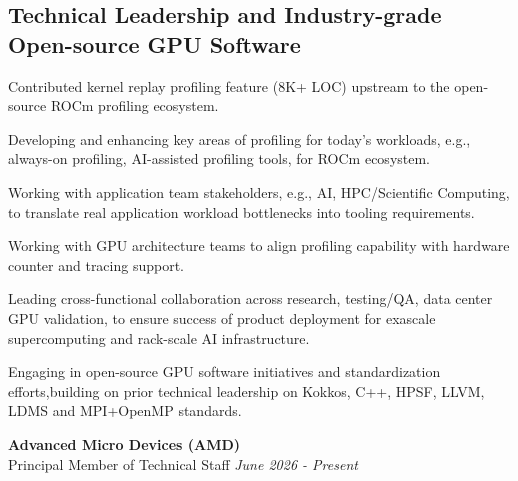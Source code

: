 \subsection*{Technical Leadership and Industry-grade Open-source GPU Software}

\myExpOne
{
\item Contributed kernel replay profiling feature (8K+ LOC) upstream to the open-source ROCm profiling ecosystem.
\item Developing and enhancing key areas of profiling for today’s workloads, e.g., always-on profiling, AI-assisted profiling tools, for ROCm ecosystem. 
\item Working with application team stakeholders, e.g., AI, HPC/Scientific Computing, to translate real application workload bottlenecks into tooling requirements.
\item Working with GPU architecture teams to align profiling capability with hardware counter and tracing support.
\item Leading cross-functional collaboration across research, testing/QA, data center GPU validation, to ensure success of product deployment for exascale supercomputing and rack-scale AI infrastructure. 
\item Engaging in open-source GPU software initiatives and standardization efforts,building on prior technical leadership on Kokkos, C++, HPSF, LLVM, LDMS and MPI+OpenMP standards.
}

\textbf{Advanced Micro Devices (AMD)}\\
{Principal Member of Technical Staff} \hfill \textit{June 2026 - Present}
\noindent
\begin{itemize}[itemsep=-0.1em]\onlyitems[include={1,2}]
\myExpOne
\end{itemize}

\newcommand{\myExpTwo}{
\item Software design and implementation for tools for distributed GPU programming with Kokkos, specifically (1) inter-process profiling and adaptivity via PMPI and (2) job-level monitoring and feedback via LDMS and DCGM.
\item Augmenting Kokkos Tools runtime auto-tuning via low-level metrics from, e.g., PAPI, CUPTI, instead of timings, reducing time to converge to optimal Kokkos tuning parameters by 32\%.
\item Developing energy-aware optimization for Kokkos via NVML, achieving 4x energy reduction.
\item Released a Spack package for Kokkos Tools, resulting in 16 new users of Kokkos Tools.
\item Developed AI-assisted HPC Tools through LLMs (coderosetta.com) and autotuning (TAU+APEX) for Kokkos applications run on NVIDIA GPUs, resulting in a poster presentation at GTC 2025.
\item Research and pathfinding on the use of AI chips with dataflow architectures, e.g., Cerebras WSE-3, for science simulations.
}

